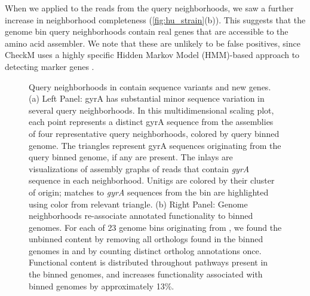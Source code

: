 When we applied \plass to the reads from the query neighborhoods, we saw
a further increase in neighborhood completeness
(\autoref{fig:hu_strain}(b)).  This suggests that the genome bin
query neighborhoods contain real genes that are accessible to the
\plass amino acid assembler.  We note that these are unlikely to be
false positives, since CheckM uses a highly specific Hidden Markov Model
(HMM)-based
approach to detecting marker genes \cite{CheckM}.

\begin{figure}[!h]
    \hspace*{0.01\linewidth}%
    \caption{Query neighborhoods in \hu contain sequence variants and new genes.
      (a) Left Panel: gyrA has substantial minor sequence variation in several
      query neighborhoods. In this multidimensional scaling plot, each point
      represents a distinct gyrA sequence from the \plass assemblies of four
      representative query neighborhoods, colored by query binned genome.
      The triangles represent gyrA sequences originating from the
      query binned genome, if any are present.  The inlays
      are visualizations of assembly graphs of reads that contain {\em gyrA}
      sequence in each neighborhood. Unitigs are colored by their cluster of origin;
      matches to {\em gyrA} sequences from the bin are highlighted using color from relevant triangle.
      (b) Right Panel: Genome neighborhoods re-associate annotated
    functionality to binned genomes. For each of 23 genome bins
    originating from \hu, we found the unbinned content by removing all
    orthologs found in the binned genomes in \cite{hu} and by counting distinct
    ortholog annotations once. Functional content is
    distributed throughout pathways present in the binned genomes,
    and increases functionality associated with binned genomes by
    approximately 13\%.}
  \label{fig:hu_content}
\end{figure}


